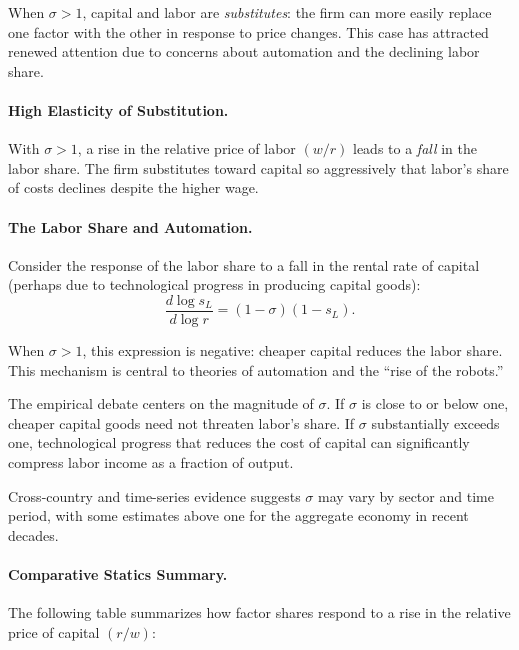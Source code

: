 When $\sigma > 1$, capital and labor are \emph{substitutes}: the firm can more easily replace one factor with the other in response to price changes. This case has attracted renewed attention due to concerns about automation and the declining labor share.

\paragraph{High Elasticity of Substitution.}
With $\sigma > 1$, a rise in the relative price of labor $(w/r)$ leads to a \emph{fall} in the labor share. The firm substitutes toward capital so aggressively that labor's share of costs declines despite the higher wage.

\paragraph{The Labor Share and Automation.}
Consider the response of the labor share to a fall in the rental rate of capital (perhaps due to technological progress in producing capital goods):
\begin{equation}
\frac{d \log s_L}{d \log r} = (1 - \sigma)(1 - s_L).
\label{eq:labor-share-response}
\end{equation}

When $\sigma > 1$, this expression is negative: cheaper capital reduces the labor share. This mechanism is central to theories of automation and the ``rise of the robots.''

\begin{calloutnote}
The empirical debate centers on the magnitude of $\sigma$. If $\sigma$ is close to or below one, cheaper capital goods need not threaten labor's share. If $\sigma$ substantially exceeds one, technological progress that reduces the cost of capital can significantly compress labor income as a fraction of output.

Cross-country and time-series evidence suggests $\sigma$ may vary by sector and time period, with some estimates above one for the aggregate economy in recent decades.
\end{calloutnote}

\paragraph{Comparative Statics Summary.}
The following table summarizes how factor shares respond to a rise in the relative price of capital $(r/w)$:

